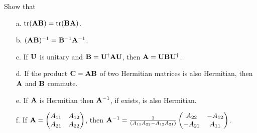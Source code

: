 \documentclass[a4paper]{book}
\newcommand\tr[1]{\mathrm{tr(#1)}}
\newcommand{\A}{{\bf A}}
\newcommand{\B}{{\bf B}}
\newcommand{\C}{{\bf C}}
\newcommand{\U}{{\bf U}}
\begin{document}
	\begin{exercise}
	Show that 
	\begin{enumerate}
	
	\item[a.] $\tr{\A\B} = \tr{\B\A}$.
	
	\item[b.] $(\A\B)^{-1}=\B^{-1}\A^{-1}$.
	
	\item[c.] If $\U$ is unitary and $\B = \U^\dagger \A \U$, then $\A = \U \B \U^\dagger$.
	
	\item[d.] If the product $\C=\A\B$ of two Hermitian matrices is also Hermitian, then $\A$ and $\B$ commute.
	
	\item[e.] If $\A$ is Hermitian then $\A^{-1}$, if exists, is also Hermitian.
	
	\item[f.] If $\A=\begin{pmatrix} A_{11} & A_{12} \\ A_{21} & A_{22}	\end{pmatrix}$, then $\A^{-1}=\frac{1}{ ( A_{11} A_{22} - A_{12} A_{21} ) }\begin{pmatrix} A_{22} & -A_{12} \\ -A_{21} & A_{11}	\end{pmatrix}$.
	
	\end{enumerate}
	\end{exercise}
	
\end{document}
